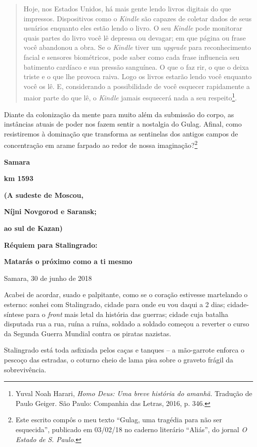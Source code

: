 \begin{quote}
Hoje, nos Estados Unidos, há mais gente lendo livros digitais do que
impressos. Dispositivos como o \emph{Kindle} são capazes de coletar
dados de seus usuários enquanto eles estão lendo o livro. O seu
\emph{Kindle} pode monitorar quais partes do livro você lê depressa ou
devagar; em que página ou frase você abandonou a obra. Se o
\emph{Kindle} tiver um \emph{upgrade} para reconhecimento facial e
sensores biométricos, pode saber como cada frase influencia seu
batimento cardíaco e sua pressão sanguínea. O que o faz rir, o que o
deixa triste e o que lhe provoca raiva. Logo os livros estarão lendo
você enquanto você os lê. E, considerando a possibilidade de você
esquecer rapidamente a maior parte do que lê, o \emph{Kindle} jamais
esquecerá nada a seu respeito\footnote{Yuval Noah Harari, \emph{Homo
  Deus: Uma breve história do amanhã.} Tradução de Paulo Geiger. São
  Paulo: Companhia das Letras, 2016, p. 346.}.
\end{quote}

Diante da colonização da mente para muito além da submissão do corpo, as
instâncias atuais de poder nos fazem sentir a nostalgia do Gulag.
Afinal, como resistiremos à dominação que transforma as sentinelas dos
antigos campos de concentração em arame farpado ao redor de nossa
imaginação?\footnote{Este escrito compôs o meu texto ``Gulag, uma
  tragédia para não ser esquecida'', publicado em 03/02/18 no caderno
  literário ``Aliás'', do jornal \emph{O Estado de S. Paulo}.}

\textbf{Samara}

\textbf{km 1593}

\textbf{(A sudeste de Moscou, }

\textbf{Níjni Novgorod e Saransk; }

\textbf{ao sul de Kazan)}

\textbf{Réquiem para Stalingrado:}

\textbf{Matarás o próximo como a ti mesmo}

Samara, 30 de junho de 2018

Acabei de acordar, suado e palpitante, como se o coração estivesse
martelando o esterno: sonhei com Stalingrado, cidade para onde eu vou
daqui a 2 dias; cidade-síntese para o \emph{front} mais letal da
história das guerras; cidade cuja batalha disputada rua a rua, ruína a
ruína, soldado a soldado começou a reverter o curso da Segunda Guerra
Mundial contra os piratas nazistas.

Stalingrado está toda asfixiada pelos caças e tanques -- a mão-garrote
enforca o pescoço das estradas, o coturno cheio de lama pisa sobre o
graveto frágil da sobrevivência.

